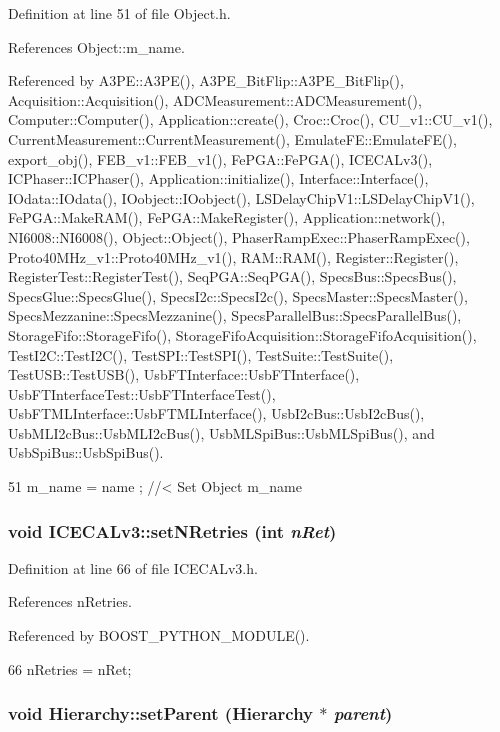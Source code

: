 Definition at line 51 of file Object.h.

References Object::m\_\-name.

Referenced by A3PE::A3PE(), A3PE\_\-BitFlip::A3PE\_\-BitFlip(), Acquisition::Acquisition(), ADCMeasurement::ADCMeasurement(), Computer::Computer(), Application::create(), Croc::Croc(), CU\_\-v1::CU\_\-v1(), CurrentMeasurement::CurrentMeasurement(), EmulateFE::EmulateFE(), export\_\-obj(), FEB\_\-v1::FEB\_\-v1(), FePGA::FePGA(), ICECALv3(), ICPhaser::ICPhaser(), Application::initialize(), Interface::Interface(), IOdata::IOdata(), IOobject::IOobject(), LSDelayChipV1::LSDelayChipV1(), FePGA::MakeRAM(), FePGA::MakeRegister(), Application::network(), NI6008::NI6008(), Object::Object(), PhaserRampExec::PhaserRampExec(), Proto40MHz\_\-v1::Proto40MHz\_\-v1(), RAM::RAM(), Register::Register(), RegisterTest::RegisterTest(), SeqPGA::SeqPGA(), SpecsBus::SpecsBus(), SpecsGlue::SpecsGlue(), SpecsI2c::SpecsI2c(), SpecsMaster::SpecsMaster(), SpecsMezzanine::SpecsMezzanine(), SpecsParallelBus::SpecsParallelBus(), StorageFifo::StorageFifo(), StorageFifoAcquisition::StorageFifoAcquisition(), TestI2C::TestI2C(), TestSPI::TestSPI(), TestSuite::TestSuite(), TestUSB::TestUSB(), UsbFTInterface::UsbFTInterface(), UsbFTInterfaceTest::UsbFTInterfaceTest(), UsbFTMLInterface::UsbFTMLInterface(), UsbI2cBus::UsbI2cBus(), UsbMLI2cBus::UsbMLI2cBus(), UsbMLSpiBus::UsbMLSpiBus(), and UsbSpiBus::UsbSpiBus().


\begin{DoxyCode}
51 { m_name  = name  ; } //< Set Object m_name
\end{DoxyCode}
\hypertarget{classICECALv3_aae0b7539c0bba5311aab99e000d1be6d}{
\subsubsection[{setNRetries}]{\setlength{\rightskip}{0pt plus 5cm}void ICECALv3::setNRetries (int {\em nRet})}}
\label{classICECALv3_aae0b7539c0bba5311aab99e000d1be6d}


Definition at line 66 of file ICECALv3.h.

References nRetries.

Referenced by BOOST\_\-PYTHON\_\-MODULE().


\begin{DoxyCode}
66 {   nRetries = nRet;                                }
\end{DoxyCode}
\hypertarget{classHierarchy_a585ad1aeec16077a0e532ab8b4fc557b}{
\subsubsection[{setParent}]{\setlength{\rightskip}{0pt plus 5cm}void Hierarchy::setParent ({\bf Hierarchy} $\ast$ {\em parent})}}
\label{classHierarchy_a585ad1aeec16077a0e532ab8b4fc557b}


